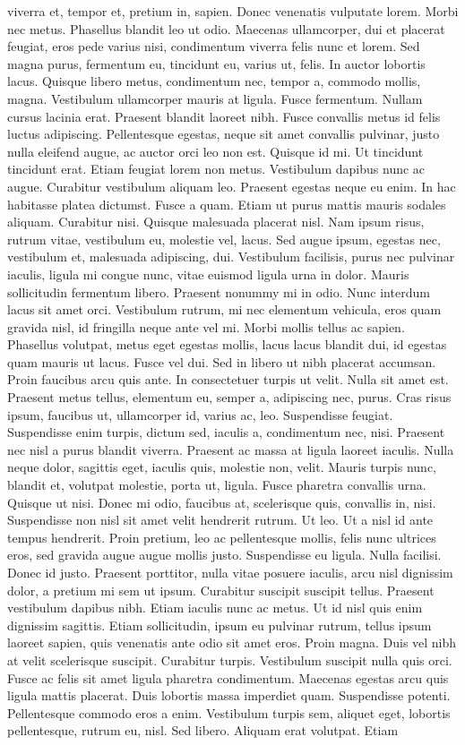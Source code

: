 viverra et, tempor et, pretium in, sapien. Donec venenatis vulputate lorem. Morbi nec metus. Phasellus blandit leo ut odio. Maecenas ullamcorper, dui et placerat feugiat, eros pede varius nisi, condimentum viverra felis nunc et lorem. Sed magna purus, fermentum eu, tincidunt eu, varius ut, felis. In auctor lobortis lacus. Quisque libero metus, condimentum nec, tempor a, commodo mollis, magna. Vestibulum ullamcorper mauris at ligula. Fusce fermentum. Nullam cursus lacinia erat. Praesent blandit laoreet nibh. Fusce convallis metus id felis luctus adipiscing. Pellentesque egestas, neque sit amet convallis pulvinar, justo nulla eleifend augue, ac auctor orci leo non est. Quisque id mi. Ut tincidunt tincidunt erat. Etiam feugiat lorem non metus. Vestibulum dapibus nunc ac augue. Curabitur vestibulum aliquam leo. Praesent egestas neque eu enim. In hac habitasse platea dictumst. Fusce a quam. Etiam ut purus mattis mauris sodales aliquam. Curabitur nisi. Quisque malesuada placerat nisl. Nam ipsum risus, rutrum vitae, vestibulum eu, molestie vel, lacus. Sed augue ipsum, egestas nec, vestibulum et, malesuada adipiscing, dui. Vestibulum facilisis, purus nec pulvinar iaculis, ligula mi congue nunc, vitae euismod ligula urna in dolor. Mauris sollicitudin fermentum libero. Praesent nonummy mi in odio. Nunc interdum lacus sit amet orci. Vestibulum rutrum, mi nec elementum vehicula, eros quam gravida nisl, id fringilla neque ante vel mi. Morbi mollis tellus ac sapien. Phasellus volutpat, metus eget egestas mollis, lacus lacus blandit dui, id egestas quam mauris ut lacus. Fusce vel dui. Sed in libero ut nibh placerat accumsan. Proin faucibus arcu quis ante. In consectetuer turpis ut velit. Nulla sit amet est. Praesent metus tellus, elementum eu, semper a, adipiscing nec, purus. Cras risus ipsum, faucibus ut, ullamcorper id, varius ac, leo. Suspendisse feugiat. Suspendisse enim turpis, dictum sed, iaculis a, condimentum nec, nisi. Praesent nec nisl a purus blandit viverra. Praesent ac massa at ligula laoreet iaculis. Nulla neque dolor, sagittis eget, iaculis quis, molestie non, velit. Mauris turpis nunc, blandit et, volutpat molestie, porta ut, ligula. Fusce pharetra convallis urna. Quisque ut nisi. Donec mi odio, faucibus at, scelerisque quis, convallis in, nisi. Suspendisse non nisl sit amet velit hendrerit rutrum. Ut leo. Ut a nisl id ante tempus hendrerit. Proin pretium, leo ac pellentesque mollis, felis nunc ultrices eros, sed gravida augue augue mollis justo. Suspendisse eu ligula. Nulla facilisi. Donec id justo. Praesent porttitor, nulla vitae posuere iaculis, arcu nisl dignissim dolor, a pretium mi sem ut ipsum. Curabitur suscipit suscipit tellus. Praesent vestibulum dapibus nibh. Etiam iaculis nunc ac metus. Ut id nisl quis enim dignissim sagittis. Etiam sollicitudin, ipsum eu pulvinar rutrum, tellus ipsum laoreet sapien, quis venenatis ante odio sit amet eros. Proin magna. Duis vel nibh at velit scelerisque suscipit. Curabitur turpis. Vestibulum suscipit nulla quis orci. Fusce ac felis sit amet ligula pharetra condimentum. Maecenas egestas arcu quis ligula mattis placerat. Duis lobortis massa imperdiet quam. Suspendisse potenti. Pellentesque commodo eros a enim. Vestibulum turpis sem, aliquet eget, lobortis pellentesque, rutrum eu, nisl. Sed libero. Aliquam erat volutpat. Etiam 